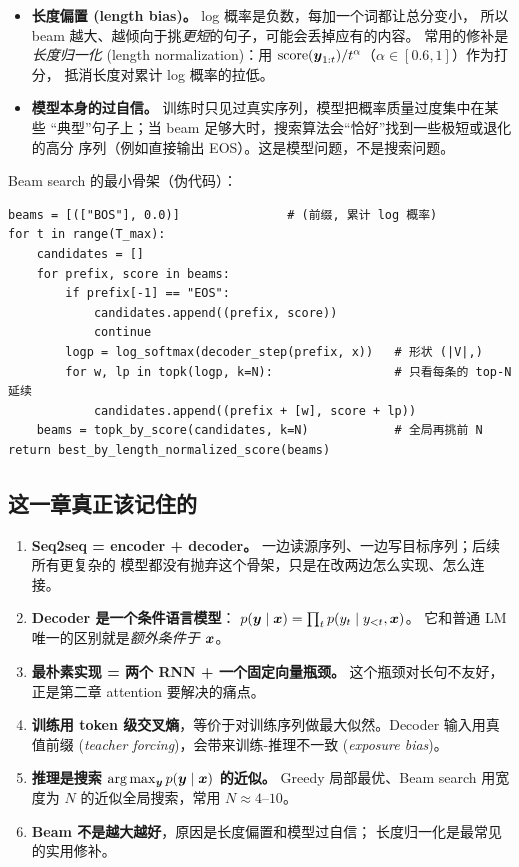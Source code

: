 \begin{itemize}
    \item \textbf{长度偏置 (length bias)。} log 概率是负数，每加一个词都让总分变小，
          所以 beam 越大、越倾向于挑\emph{更短}的句子，可能会丢掉应有的内容。
          常用的修补是\emph{长度归一化} (length normalization)：用
          $\mathrm{score}(\boldsymbol{y}_{1:t}) / t^{\alpha}$（$\alpha \in [0.6, 1]$）作为打分，
          抵消长度对累计 log 概率的拉低。
    \item \textbf{模型本身的过自信。} 训练时只见过真实序列，模型把概率质量过度集中在某些
          “典型”句子上；当 beam 足够大时，搜索算法会“恰好”找到一些极短或退化的高分
          序列（例如直接输出 EOS）。这是模型问题，不是搜索问题。
\end{itemize}

\begin{engbox}
Beam search 的最小骨架（伪代码）：
\begin{lstlisting}
beams = [(["BOS"], 0.0)]               # (前缀, 累计 log 概率)
for t in range(T_max):
    candidates = []
    for prefix, score in beams:
        if prefix[-1] == "EOS":
            candidates.append((prefix, score))
            continue
        logp = log_softmax(decoder_step(prefix, x))   # 形状 (|V|,)
        for w, lp in topk(logp, k=N):                 # 只看每条的 top-N 延续
            candidates.append((prefix + [w], score + lp))
    beams = topk_by_score(candidates, k=N)            # 全局再挑前 N
return best_by_length_normalized_score(beams)
\end{lstlisting}
\end{engbox}

\subsection{这一章真正该记住的}

\begin{keypointblock}
\begin{enumerate}
    \item \textbf{Seq2seq = encoder + decoder。} 一边读源序列、一边写目标序列；后续所有更复杂的
          模型都没有抛弃这个骨架，只是在改两边怎么实现、怎么连接。
    \item \textbf{Decoder 是一个条件语言模型}：
          $p(\boldsymbol{y} \mid \boldsymbol{x}) = \prod_t p(y_t \mid y_{<t}, \boldsymbol{x})$。
          它和普通 LM 唯一的区别就是\emph{额外条件于 $\boldsymbol{x}$}。
    \item \textbf{最朴素实现 = 两个 RNN + 一个固定向量瓶颈。} 这个瓶颈对长句不友好，
          正是第二章 attention 要解决的痛点。
    \item \textbf{训练用 token 级交叉熵}，等价于对训练序列做最大似然。Decoder 输入用真值前缀
          (\emph{teacher forcing})，会带来训练-推理不一致 (\emph{exposure bias})。
    \item \textbf{推理是搜索 $\arg\max_{\boldsymbol{y}} p(\boldsymbol{y} \mid \boldsymbol{x})$ 的近似。}
          Greedy 局部最优、Beam search 用宽度为 $N$ 的近似全局搜索，常用 $N \approx 4\text{--}10$。
    \item \textbf{Beam 不是越大越好}，原因是长度偏置和模型过自信；
          长度归一化是最常见的实用修补。
\end{enumerate}
\end{keypointblock}
